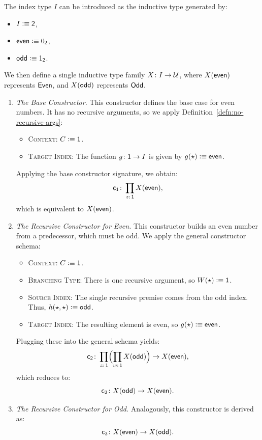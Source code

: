 The index type $I$ can be introduced as the inductive type generated by:
\begin{itemize}
    \item $I\mathrel{\vcentcolon}\equiv\mathsf{2}$,
    \item $\mathsf{even}\mathrel{\vcentcolon}\equiv 0_{\mathsf{2}}$,
    \item $\mathsf{odd}\mathrel{\vcentcolon}\equiv 1_{\mathsf{2}}$.
\end{itemize}
We then define a single inductive type family $X\colon I\to\univ$, where $X(\mathsf{even})$ represents $\mathsf{Even}$, and $X(\mathsf{odd})$ represents $\mathsf{Odd}$.
\begin{enumerate}
    \item \textit{The Base Constructor.} This constructor defines the base case for even numbers. It has no recursive arguments, so we apply Definition~\ref{defn:no-recursive-args}:
    \begin{itemize}
        \item \textsc{Context:} $C\mathrel{\vcentcolon}\equiv\mathsf{1}$.
        
        \item \textsc{Target Index:} The function $g\colon\fun1\to I$ is given by $g({\mathsf{\star}})\mathrel{\vcentcolon}\equiv\mathsf{even}$.
    \end{itemize}
    Applying the base constructor signature, we obtain:
    \[
        \fun{c_1}\colon\prod_{z\colon\fun1}X(\fun{even}),
    \]
    which is equivalent to $X(\mathsf{even})$.

    \item \textit{The Recursive Constructor for Even.}
    This constructor builds an even number from a predecessor, which must be odd. We apply the general constructor schema:
    \begin{itemize}
        \item \textsc{Context:} $C\mathrel{\vcentcolon}\equiv\mathsf{1}$.
        
        \item \textsc{Branching Type:} There is one recursive argument, so $W({\mathsf{\star}})\mathrel{\vcentcolon}\equiv \mathsf{1}$.
        
        \item \textsc{Source Index:} The single recursive premise comes from the odd index. Thus, $h({\mathsf{\star}},{\mathsf{\star}})\mathrel{\vcentcolon}\equiv\mathsf{odd}$.
        
        \item \textsc{Target Index:} The resulting element is even, so $g({\mathsf{\star}})\mathrel{\vcentcolon}\equiv\mathsf{even}$.
    \end{itemize}
    Plugging these into the general schema yields:
    \[
        \fun{c_2}\colon\prod_{z\colon\fun1}
            \Bigl(
                \prod_{w\colon\fun1}X(\fun{odd})
            \Bigr)
            \to X(\fun{even}),
    \]
    which reduces to:
    \[
        \fun c_2\colon X(\fun{odd})\to X(\fun{even}).
    \]

    \item \textit{The Recursive Constructor for Odd.} Analogously, this constructor is derived as:
    \[
        \fun{c_3}\colon X(\fun{even})\to X(\fun{odd}).
    \]
\end{enumerate}

